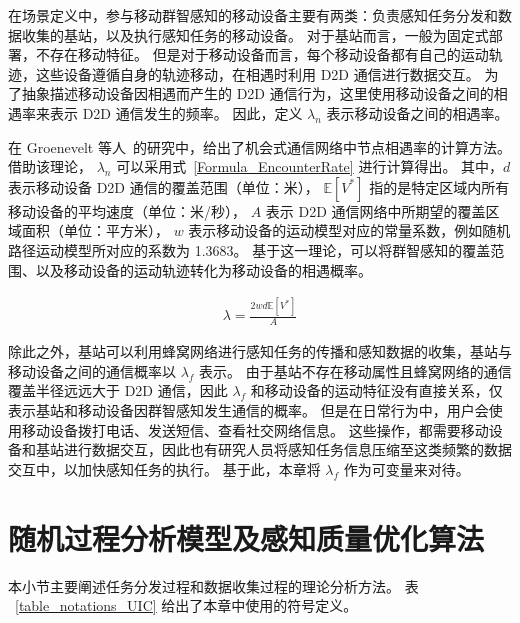 在场景定义中，参与移动群智感知的移动设备主要有两类：负责感知任务分发和数据收集的基站，以及执行感知任务的移动设备。
对于基站而言，一般为固定式部署，不存在移动特征。
但是对于移动设备而言，每个移动设备都有自己的运动轨迹，这些设备遵循自身的轨迹移动，在相遇时利用 D2D 通信进行数据交互。
为了抽象描述移动设备因相遇而产生的 D2D 通信行为，这里使用移动设备之间的相遇率来表示 D2D 通信发生的频率。
因此，定义 $\lambda_n$ 表示移动设备之间的相遇率。

在 Groenevelt 等人~\cite{DBLP:journals/pe/GroeneveltNK05}的研究中，给出了机会式通信网络中节点相遇率的计算方法。
借助该理论， $\lambda_n$ 可以采用式~\eqref{Formula_EncounterRate} 进行计算得出。
其中，$d$ 表示移动设备 D2D 通信的覆盖范围（单位：米），
$\mathbb{E}[V^*]$ 指的是特定区域内所有移动设备的平均速度（单位：米/秒），
$A$ 表示 D2D 通信网络中所期望的覆盖区域面积（单位：平方米），
$w$ 表示移动设备的运动模型对应的常量系数，例如随机路径运动模型所对应的系数为 1.3683。
基于这一理论，可以将群智感知的覆盖范围、以及移动设备的运动轨迹转化为移动设备的相遇概率。

\vspace{-1em}
\begin{equation}
  \label{Formula_EncounterRate}
  \begin{gathered}
  \lambda = \frac{2 w d \mathbb{E}[V^*]}{A}
  \end{gathered}
\end{equation}

除此之外，基站可以利用蜂窝网络进行感知任务的传播和感知数据的收集，基站与移动设备之间的通信概率以 $\lambda_f$ 表示。
由于基站不存在移动属性且蜂窝网络的通信覆盖半径远远大于 D2D 通信，因此 $\lambda_f$ 和移动设备的运动特征没有直接关系，仅表示基站和移动设备因群智感知发生通信的概率。
但是在日常行为中，用户会使用移动设备拨打电话、发送短信、查看社交网络信息。
这些操作，都需要移动设备和基站进行数据交互，因此也有研究人员将感知任务信息压缩至这类频繁的数据交互中，以加快感知任务的执行。
基于此，本章将 $\lambda_f$ 作为可变量来对待。


\section{随机过程分析模型及感知质量优化算法}
本小节主要阐述任务分发过程和数据收集过程的理论分析方法。
表 ~\ref{table_notations_UIC} 给出了本章中使用的符号定义。

